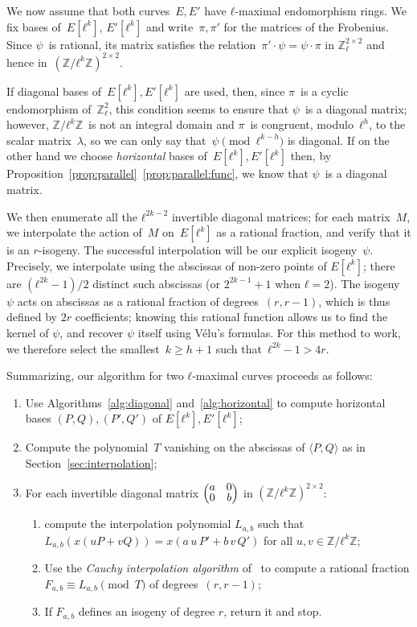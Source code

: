 \documentclass{lms}
\def\mat#1{\begin{pmatrix}#1\end{pmatrix}}
\def\smat#1{{\def\arraystretch{.7}\mat{#1}}}
\begin{document}
We now assume that both curves~$E, E'$
have $ℓ$-maximal endomorphism rings.
We fix bases of~$E[ℓ^k]$, $E'[ℓ^k]$ and write~$π, π'$ for the matrices
of the Frobenius.
Since $ψ$~is rational, its matrix satisfies the relation~$π' · ψ = ψ · π$
in $ℤ_ℓ^{2×2}$ and hence in~$(ℤ/ℓ^k ℤ)^{2 × 2}$.

If diagonal bases of~$E[ℓ^k], E'[ℓ^k]$ are used, then,
since $π$~is a cyclic endomorphism of~$ℤ_ℓ^2$,
this condition seems to ensure that $ψ$~is a diagonal matrix;
however, $ℤ/ℓ^k ℤ$~is not an integral domain
and $π$~is congruent, modulo~$ℓ^h$, to the scalar matrix~$λ$,
so we can only say that~$ψ\pmod{ℓ^{k-h}}$ is diagonal.
If on the other hand we choose \emph{horizontal} bases
of~$E[ℓ^k], E'[ℓ^k]$ then, by Proposition~\ref{prop:parallel}~\ref{prop:parallel:func},
we know that $ψ$~is a diagonal matrix.

We then enumerate all the $ℓ^{2k-2}$ invertible diagonal matrices; for
each matrix~$M$, we interpolate the action of~$M$ on~$E[ℓ^k]$ as a
rational fraction, and verify that it is an $r$-isogeny. The
successful interpolation will be our explicit isogeny~$ψ$.
Precisely, we interpolate using the abscissas of non-zero points of $E[ℓ^k]$;
there are $(ℓ^{2k}-1)/2$ distinct such abscissas (or $2^{2k-1}+1$ when
$ℓ=2$).  The isogeny~$ψ$ acts on abscissas as a rational fraction of
degrees~$(r, r-1)$, which is thus defined by $2r$ coefficients; 
knowing this rational function allows us to find the kernel of $\psi$,
and recover $\psi$ itself using V\'elu's formulas. For this
method to work, we therefore select the smallest~$k ≥ h+1$ such
that~$ℓ^{2k}-1 > 4r$.

Summarizing, our algorithm for two
$ℓ$-maximal curves proceeds as follows:
\begin{enumerate}
\item\label{alg:ours:horizontal} Use Algorithms~\ref{alg:diagonal}
  and~\ref{alg:horizontal} to compute horizontal bases $(P,Q), (P', Q')$
  of $E[ℓ^k], E'[ℓ^k]$;
\item\label{alg:ours:T} Compute the polynomial~$T$ vanishing
  on the abscissas of $\langle P,Q\rangle$ as in
  Section~\ref{sec:interpolation};
\item\label{alg:ours:for} For each invertible diagonal matrix
  $\smat{a&0\\0&b}$ in $(ℤ/ℓ^k ℤ)^{2×2}$:
  \begin{enumerate}
  \item\label{alg:ours:interp} compute the interpolation polynomial
    $L_{a,b}$ such that
    $L_{a,b} (x (u P + v Q)) = x(a\, u\,P' + b\,v\, Q')$ for all
    $u, v ∈ ℤ/ℓ^k ℤ$;
  \item\label{alg:ours:cauchy} Use the \emph{Cauchy interpolation
      algorithm} of~\cite[Chapter~5.8]{vzGG} to compute a rational
    fraction $F_{a,b}≡L_{a,b}\pmod{T}$ of degrees~$(r, r-1)$;
  \item If $F_{a,b}$ defines an isogeny of degree $r$, return it and
    stop.
  \end{enumerate}
\end{enumerate}
\end{document}
